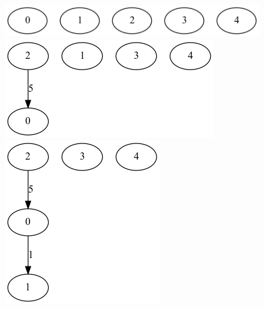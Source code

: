 \documentclass{article}
\begin{document}
\begin{figure}[!htb]
  \includegraphics[width=\linewidth]{"./output/graph_prim_iteration_1.png"}

\endminipage\hfill
{}
  \includegraphics[width=\linewidth]{"./output/graph_prim_iteration_2.png"}

\endminipage\hfill
{}
  \includegraphics[width=\linewidth]{"./output/graph_prim_iteration_3.png"}


\end{figure}
\end{document}
